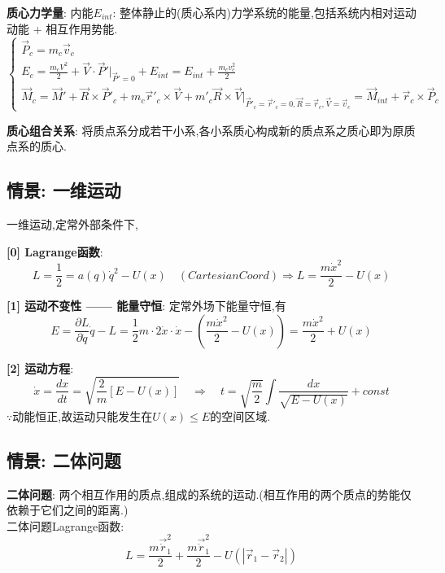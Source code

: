 \documentclass{article}
\begin{document}
        \textbf{质心力学量}:
            内能$E_{int}$: 整体静止的(质心系内)力学系统的能量,包括系统内相对运动动能 + 相互作用势能.\\
            \begin{displaymath}
                \left\{ \begin{array}{ll}
                \vec P_c = m_c \vec v_c\\
                E_c = \frac{m_c V^2}{2} + \vec V \cdot \vec P' |_{\vec P'=0} + E_{int} = E_{int} + \frac{m_c v_c^2}{2}\\
                \vec M_c = \vec M' + \vec R \times \vec P'_c + m_c \vec r'_c \times \vec V + m'_c \vec R \times \vec V|_{\vec P'_c =\vec r'_c = 0, \vec R =\vec r_c, \vec V =\vec v_c} = \vec M_{int} + \vec r_c \times \vec P_c 
                \end{array} \right.
            \end{displaymath}
            
        \textbf{质心组合关系}: 将质点系分成若干小系,各小系质心构成新的质点系之质心即为原质点系的质心.


    \subsection{情景: 一维运动}
        一维运动,定常外部条件下,
        
        \textbf{[0] Lagrange函数}:
            $$L = \frac{1}{2} = a(q) \dot q^2 - U(x)\quad (CartesianCoord)\Rightarrow L = \frac{m \dot x^2}{2} - U(x)$$
        
        \textbf{[1] 运动不变性 —— 能量守恒}: 定常外场下能量守恒,有
            $$E = \frac{\partial L}{\partial \dot q}\dot q - L = \frac{1}{2}m\cdot 2 \dot x \cdot \dot x - (\frac{m \dot x^2}{2} - U(x)) = \frac{m \dot x^2}{2} + U(x) $$
        
        \textbf{[2] 运动方程}:
            $$\dot x = \frac{dx}{dt} = \sqrt{\frac{2}{m}[E - U(x)]}\quad \Rightarrow \quad t = \sqrt{\frac{m}{2}} \int \frac{dx}{\sqrt{E - U(x)}} + const$$
            $\because$动能恒正,故运动只能发生在$U(x) \leqslant E$的空间区域.


    \subsection{情景: 二体问题}
        \textbf{二体问题}: 两个相互作用的质点,组成的系统的运动.(相互作用的两个质点的势能仅依赖于它们之间的距离.)\\
        二体问题Lagrange函数:
            $$L = \frac{m \vec \dot r_1^2}{2} + \frac{m \vec \dot r_1^2}{2} - U(|\vec r_1 - \vec r_2|)$$
        
\end{document}

